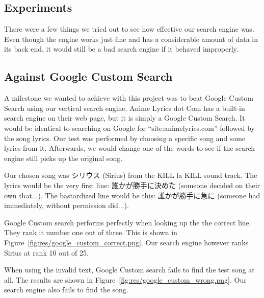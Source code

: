 \documentclass{acm} %
\begin{document}
\begin{CJK}{UTF8}{zhsong}
\section{Experiments}

There were a few things we tried out to see how effective our search engine was. Even though the engine works just fine and has a considerable amount of data in its back end, it would still be a bad search engine if it behaved improperly.


\subsection{Against Google Custom Search}

A milestone we wanted to achieve with this project was to beat Google Custom Search using our vertical search engine. Anime Lyrics dot Com has a built-in search engine on their web page, but it is simply a Google Custom Search. It would be identical to searching on Google for ``site:animelyrics.com'' followed by the song lyrics. Our test was performed by choosing a specific song and some lyrics from it. Afterwards, we would change one of the words to see if the search engine still picks up the original song.

Our chosen song was シリウス (Sirius) from the KILL la KILL sound track. The lyrics would be the very first line: 誰かが勝手に決めた (someone decided on their own that...). The bastardized line would be this: 誰かが勝手に急に (someone had immediately, without permission did...).

Google Custom search performs perfectly when looking up the the correct line. They rank it number one out of three. This is shown in Figure~\ref{fig:res/google_custom_correct.png}. Our search engine however ranks Sirius at rank 10 out of 25.


When using the invalid text, Google Custom search fails to find the test song at all. The results are shown in Figure~\ref{fig:res/google_custom_wrong.png}. Our search engine also fails to find the song.


\end{CJK}
\end{document}
